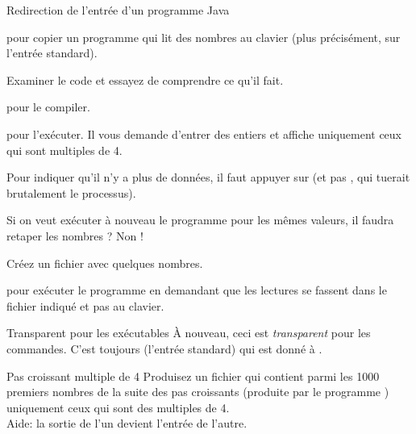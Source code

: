 \documentclass[a4paper,11pt]{style-esi/td}
\begin{document}
		\begin{Experience}{Redirection de l'entrée d'un programme Java}
			\begin{steps}
			\item 
				pour copier un programme  qui lit des nombres
				au clavier (plus précisément, sur l'entrée standard).
			\item 
				Examiner le code et essayez de comprendre ce qu'il fait.
			\item 
				 pour le compiler.
			\item 
				 pour l'exécuter.
				Il vous demande d'entrer des entiers et affiche
				uniquement ceux qui sont multiples de 4.
			\item 
				Pour indiquer qu'il n'y a plus de données,
				il faut appuyer sur 
				(et pas , qui tuerait brutalement le processus).
			\end{steps}
			Si on veut exécuter à nouveau le programme pour les mêmes valeurs,
			il faudra retaper les nombres ? Non !
			\begin{steps}
			\item 
				Créez un fichier  avec quelques nombres.
			\item 
				 pour exécuter
				le programme en demandant que les lectures se fassent
				dans le fichier indiqué et pas au clavier.
			\end{steps}
		\end{Experience}	

		\medskip
		\begin{alerttbox}{Transparent pour les exécutables}
			À nouveau, ceci est \emph{transparent} pour les commandes.
			C'est toujours  (l'entrée standard) 
			qui est donné à .
		\end{alerttbox}

		\begin{Exercice}{Pas croissant multiple de 4 }
			Produisez un fichier 
			qui contient parmi les 1000 premiers nombres de la suite
			des pas croissants (produite par le programme )
			uniquement ceux qui sont des multiples de 4.
			\\Aide: la sortie de l'un devient l'entrée de l'autre.
		\end{Exercice}
\end{document}
